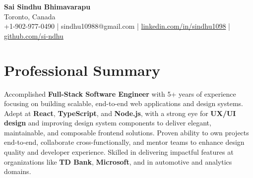 \documentclass[letterpaper,11pt]{article}
\begin{document}
\begin{center}
  {\Large \textbf{Sai Sindhu Bhimavarapu}} \\
  Toronto, Canada \\
  +1-902-977-0490 \enspace | \enspace sindhu10988@gmail.com \enspace | \enspace \href{https://www.linkedin.com/in/sindhu1098/}{linkedin.com/in/sindhu1098} \enspace | \enspace \href{https://github.com/si-ndhu}{github.com/si-ndhu}
\end{center}

\section{Professional Summary}
  \begin{itemize}[leftmargin=0.15in, label={}]
    \small{\item{
     Accomplished \textbf{Full-Stack Software Engineer} with 5+ years of experience focusing on building scalable, end-to-end web applications and design systems. Adept at \textbf{React}, \textbf{TypeScript}, and \textbf{Node.js}, with a strong eye for \textbf{UX/UI design} and improving design system components to deliver elegant, maintainable, and composable frontend solutions. Proven ability to own projects end-to-end, collaborate cross-functionally, and mentor teams to enhance design quality and developer experience. Skilled in delivering impactful features at organizations like \textbf{TD Bank}, \textbf{Microsoft}, and in automotive and analytics domains.
    }}
  \end{itemize}
\vspace{-16pt}

\end{document}
